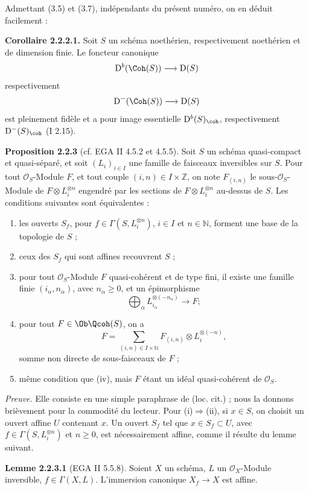 \documentclass[11pt]{article}
\begin{document}
Admettant (3.5) et (3.7), indépendants du présent numéro, on en déduit facilement :

\textbf{Corollaire 2.2.2.1.} Soit $S$ un schéma noethérien, respectivement noethérien et de dimension finie. Le foncteur canonique
\[
\mathrm D^b(\Coh(S))\longrightarrow\mathrm D(S)
\]
respectivement
\[
\mathrm D^{-}(\Coh(S))\longrightarrow\mathrm D(S)
\]
est pleinement fidèle et a pour image essentielle $\mathrm D^b(S)_{\coh}$, respectivement $\mathrm D^{-}(S)_{\coh}$ (I 2.15).

\textbf{Proposition 2.2.3} (cf. EGA II 4.5.2 et 4.5.5). Soit $S$ un schéma quasi-compact et quasi-séparé, et soit $(L_i)_{i\in I}$ une famille de faisceaux inversibles sur $S$. Pour tout $\mathcal O_S$-Module $F$, et tout couple $(i,n)\in I\times\mathbb Z$, on note $F_{(i,n)}$ le sous-$\mathcal O_S$-Module de $F\otimes L_i^{\otimes n}$ engendré par les sections de $F\otimes L_i^{\otimes n}$ au-dessus de $S$. Les conditions suivantes sont équivalentes :
\begin{enumerate}[label=(\roman*)]
\item les ouverts $S_f$, pour $f\in\Gamma(S,L_i^{\otimes n})$, $i\in I$ et $n\in\mathbb N$, forment une base de la topologie de $S$ ;
\item ceux des $S_f$ qui sont affines recouvrent $S$ ;
\item pour tout $\mathcal O_S$-Module $F$ quasi-cohérent et de type fini, il existe une famille finie $(i_\alpha,n_\alpha)$, avec $n_\alpha\ge0$, et un épimorphisme
\[
\bigoplus_\alpha L_{i_\alpha}^{\otimes(-n_\alpha)}\longrightarrow F ;
\]
\item pour tout $F\in\Ob\Qcoh(S)$, on a
\[
F=\sum_{(i,n)\in I\times\mathbb N}F_{(i,n)}\otimes L_i^{\otimes(-n)},
\]
somme non directe de sous-faisceaux de $F$ ;
\item même condition que (iv), mais $F$ étant un idéal quasi-cohérent de $\mathcal O_S$.
\end{enumerate}

\emph{Preuve.} Elle consiste en une simple paraphrase de (loc. cit.) ; nous la donnons brièvement pour la commodité du lecteur. Pour (i)$\Rightarrow$(ii), si $x\in S$, on choisit un ouvert affine $U$ contenant $x$. Un ouvert $S_f$ tel que $x\in S_f\subset U$, avec $f\in\Gamma(S,L_i^{\otimes n})$ et $n\ge0$, est nécessairement affine, comme il résulte du lemme suivant.

\textbf{Lemme 2.2.3.1} (EGA II 5.5.8). Soient $X$ un schéma, $L$ un $\mathcal O_X$-Module inversible, $f\in\Gamma(X,L)$. L'immersion canonique $X_f\to X$ est affine.
\end{document}
